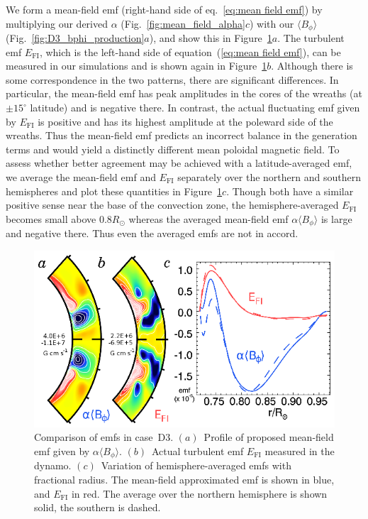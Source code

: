 We form a mean-field emf (right-hand side of eq.~\ref{eq:mean field emf}) by
multiplying our derived $\alpha$ (Fig.~\ref{fig:mean_field_alpha}$c$) with our 
$\langle B_\phi \rangle$ (Fig.~\ref{fig:D3_bphi_production}$a$), 
and show this in Figure~\ref{fig:emf_comparison}$a$.  The turbulent emf $E_\mathrm{FI}$,
which is the left-hand side of  equation~(\ref{eq:mean field emf}),
can be measured in our simulations and is shown again in Figure~\ref{fig:emf_comparison}$b$. 
Although there is some correspondence in the two patterns, there are
significant differences.  In particular, the mean-field emf has peak
amplitudes in the cores of the wreaths (at $\pm 15^\circ$ latitude)
and is negative there.  In contrast, the actual fluctuating
emf given by $E_\mathrm{FI}$ is positive and has its highest
amplitude at the poleward side of the wreaths.  Thus the mean-field
emf predicts an incorrect balance in the generation
terms and would yield a distinctly different mean poloidal magnetic field. 
To assess whether better agreement may be achieved with a
latitude-averaged emf, we average the mean-field emf and $E_\mathrm{FI}$ 
separately over the northern and southern hemispheres and plot these quantities
in Figure~\ref{fig:emf_comparison}$c$.  Though both have a similar positive sense near the base of
the convection zone, the hemisphere-averaged $E_\mathrm{FI}$ becomes
small above $0.8R_\odot$ whereas the averaged mean-field emf $\alpha
\langle B_\phi \rangle$ is large and negative there.  Thus even the averaged
emfs are not in accord.



\begin{figure}[!t]
  \begin{center}
    \includegraphics[width=0.9\linewidth]{figs/chapter_7/Figure_16/Figure_16.eps}
  \end{center}
  \caption[Comparison of emfs in case~D3] 
          {Comparison of emfs in case~D3.  
    $(a)$~Profile of proposed mean-field emf given by $\alpha \langle B_\phi \rangle$.
    $(b)$~Actual turbulent emf $E_\mathrm{FI}$ measured in the dynamo.
    $(c)$~Variation of hemisphere-averaged emfs with fractional
    radius.  The mean-field approximated emf is shown in blue, and
    $E_\mathrm{FI}$ in red.  The average over the northern
    hemisphere is shown solid, the southern is dashed.  
  \label{fig:emf_comparison}}
\end{figure}

